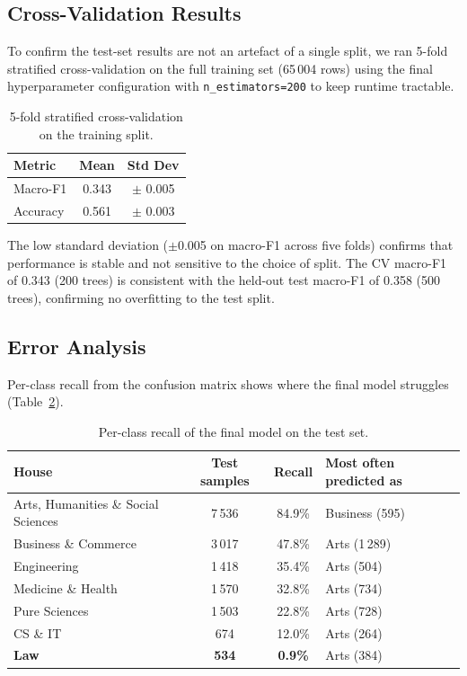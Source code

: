 \subsection{Cross-Validation Results}

To confirm the test-set results are not an artefact of a single
split, we ran 5-fold stratified cross-validation on the full
training set (65\,004 rows) using the final hyperparameter
configuration with \texttt{n\_estimators=200} to keep runtime
tractable.

\begin{table}[h]
\centering
\caption{5-fold stratified cross-validation on the training split.}
\label{tab:cv}
\begin{tabular}{lcc}
\toprule
\textbf{Metric} & \textbf{Mean} & \textbf{Std Dev} \\
\midrule
Macro-F1  & 0.343 & $\pm$ 0.005 \\
Accuracy  & 0.561 & $\pm$ 0.003 \\
\bottomrule
\end{tabular}
\end{table}

The low standard deviation ($\pm$0.005 on macro-F1 across five folds)
confirms that performance is stable and not sensitive to the choice
of split. The CV macro-F1 of 0.343 (200 trees) is consistent with the
held-out test macro-F1 of 0.358 (500 trees), confirming no overfitting to
the test split.

\subsection{Error Analysis}

Per-class recall from the confusion matrix shows where the final model
struggles (Table~\ref{tab:recall}).

\begin{table}[h]
\centering
\caption{Per-class recall of the final model on the test set.}
\label{tab:recall}
\begin{tabular}{lccl}
\toprule
\textbf{House} & \textbf{Test samples} & \textbf{Recall} & \textbf{Most often predicted as} \\
\midrule
Arts, Humanities \& Social Sciences & 7\,536 & 84.9\% & Business (595) \\
Business \& Commerce                & 3\,017 & 47.8\% & Arts (1\,289) \\
Engineering                         & 1\,418 & 35.4\% & Arts (504) \\
Medicine \& Health                  & 1\,570 & 32.8\% & Arts (734) \\
Pure Sciences                       & 1\,503 & 22.8\% & Arts (728) \\
CS \& IT                            &   674  & 12.0\% & Arts (264) \\
\textbf{Law}                        & \textbf{534} & \textbf{0.9\%} & Arts (384) \\
\bottomrule
\end{tabular}
\end{table}


